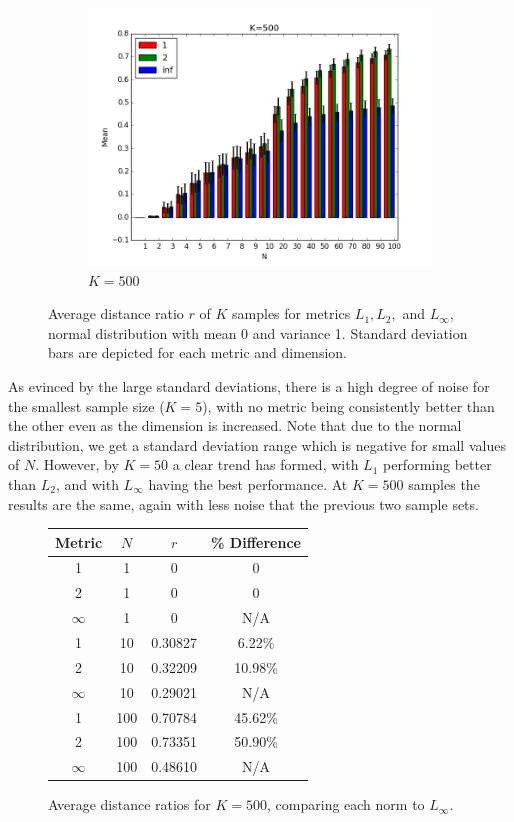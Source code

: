 \documentclass{article}
\begin{document}
\begin{figure}[H]
\centering
   \ContinuedFloat 
    \begin{subfigure}[h]{0.9\textwidth}
        \includegraphics[width=\textwidth]{l-experiment2-500-inf.png}
        \caption{$K=500$}
        \label{fig:exp2k500}
    \end{subfigure}
    \caption{Average distance ratio $r$ of $K$ samples for metrics $L_1,L_2,$ and $L_{\infty}$, normal distribution with mean 0 and variance 1. Standard deviation bars are depicted for each metric and dimension.}\label{fig:exp2}
\end{figure}
As evinced by the large standard deviations, there is a high degree of noise for the smallest sample size ($K=5$),  with no metric being consistently better than the other even as the dimension is increased. Note that due to the normal distribution, we get a standard deviation range which is negative for small values of $N$. However, by $K=50$ a clear trend has formed, with $L_1$ performing better than $L_2$, and with $L_{\infty}$ having the best performance. At $K=500$ samples the results are the same, again with less noise that the previous two sample sets.
\begin{figure}[H]
\centering
\begin{tabular}{|c|c|c|c|}
\hline
Metric & $N$ & $r$ & \% Difference\\
\hline
1 & 1 & 0 & 0\\
2 & 1 & 0 & 0\\
$\infty$ & 1 & 0 & N/A\\
\hline
1 & 10 & 0.30827 & 6.22\%\\
2 & 10 & 0.32209 & 10.98\%\\
$\infty$ & 10 & 0.29021 & N/A\\
\hline
1 & 100 & 0.70784 & 45.62\%\\
2 & 100 & 0.73351 & 50.90\%\\
$\infty$ & 100 & 0.48610 & N/A\\
\hline
\end{tabular}
\caption{Average distance ratios for $K=500$, comparing each norm to $L_{\infty}$.}
\label{fig:exp2data}
\end{figure}
\end{document}
